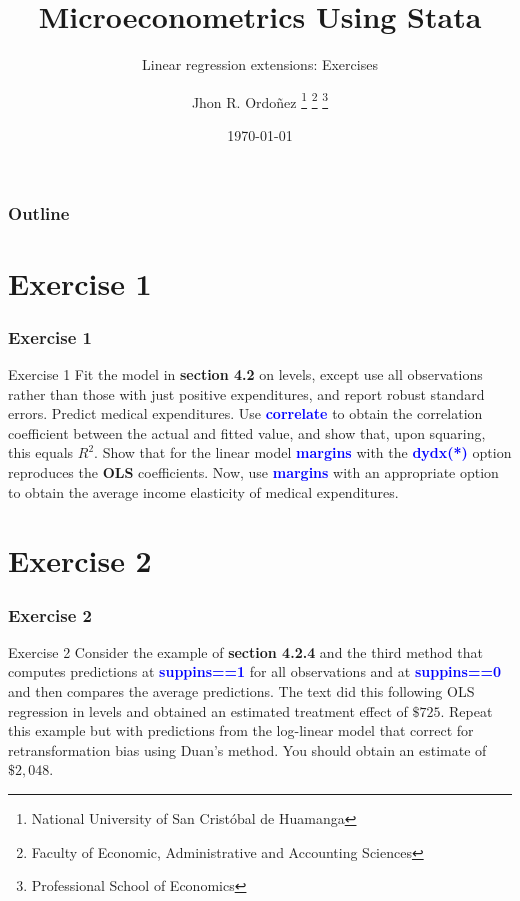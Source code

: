 \documentclass[11pt, aspectratio=169]{beamer}
\title{Microeconometrics Using Stata}
\subtitle{Linear regression extensions: Exercises}
\author{
		Jhon R. Ordoñez
		\footnote{\label{1} National University of San Cristóbal de Huamanga}
		\footnote{\label{2} Faculty of Economic, Administrative and Accounting Sciences}
		\footnote{\label{3} Professional School of Economics}
	}
\date{\today}
\begin{document}
	\begin{frame}
		\maketitle
	\end{frame}
	\begin{frame}[t]
		\frametitle{Outline}
		\tableofcontents
	\end{frame}
	\section{Exercise 1}
		\begin{frame}
			\frametitle{Exercise 1}
				\begin{block}{Exercise 1}
					Fit the model in \textcolor{red!50}{\textbf{section 4.2}} on levels, except use all observations
					rather than those with just positive expenditures, and report robust
					standard errors. Predict medical expenditures. Use \textcolor{blue}{\textbf{correlate}} to obtain
					the correlation coefficient between the actual and fitted value, and
					show that, upon squaring, this equals $R^{2}$. Show that for the linear
					model \textcolor{blue}{\textbf{margins}} with the \textcolor{blue}{\textbf{dydx(*)}} option reproduces the \textbf{OLS}
					coefficients. Now, use \textcolor{blue}{\textbf{margins}} with an appropriate option to obtain
					the average income elasticity of medical expenditures.
				\end{block}
		\end{frame}
	\section{Exercise 2}
		\begin{frame}
			\frametitle{Exercise 2}
			\begin{block}{Exercise 2}
				Consider the example of \textcolor{red!50}{\textbf{section 4.2.4}} and the third method that
				computes predictions at \textcolor{blue}{\textbf{suppins==1}} for all observations and at
				\textcolor{blue}{\textbf{suppins==0}} and then compares the average predictions. The text did
				this following OLS regression in levels and obtained an estimated
				treatment effect of $\$725$. Repeat this example but with predictions
				from the log-linear model that correct for retransformation bias using
				Duan’s method. You should obtain an estimate of $\$2,048$.
			\end{block}
		\end{frame}
\end{document}
